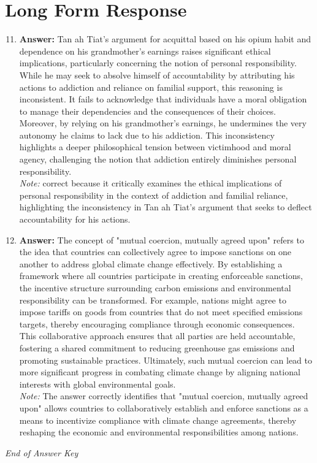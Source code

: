 \documentclass[12pt]{article}
\begin{document}
\section*{Long Form Response}
\begin{enumerate}[label=\arabic*.]
\setcounter{enumi}{10}
\item \textbf{Answer:} Tan ah Tiat's argument for acquittal based on his opium habit and dependence on his grandmother's earnings raises significant ethical implications, particularly concerning the notion of personal responsibility. While he may seek to absolve himself of accountability by attributing his actions to addiction and reliance on familial support, this reasoning is inconsistent. It fails to acknowledge that individuals have a moral obligation to manage their dependencies and the consequences of their choices. Moreover, by relying on his grandmother's earnings, he undermines the very autonomy he claims to lack due to his addiction. This inconsistency highlights a deeper philosophical tension between victimhood and moral agency, challenging the notion that addiction entirely diminishes personal responsibility.
\\ \textit{Note:} correct because it critically examines the ethical implications of personal responsibility in the context of addiction and familial reliance, highlighting the inconsistency in Tan ah Tiat's argument that seeks to deflect accountability for his actions.
\item \textbf{Answer:} The concept of "mutual coercion, mutually agreed upon" refers to the idea that countries can collectively agree to impose sanctions on one another to address global climate change effectively. By establishing a framework where all countries participate in creating enforceable sanctions, the incentive structure surrounding carbon emissions and environmental responsibility can be transformed. For example, nations might agree to impose tariffs on goods from countries that do not meet specified emissions targets, thereby encouraging compliance through economic consequences. This collaborative approach ensures that all parties are held accountable, fostering a shared commitment to reducing greenhouse gas emissions and promoting sustainable practices. Ultimately, such mutual coercion can lead to more significant progress in combating climate change by aligning national interests with global environmental goals.
\\ \textit{Note:} The answer correctly identifies that "mutual coercion, mutually agreed upon" allows countries to collaboratively establish and enforce sanctions as a means to incentivize compliance with climate change agreements, thereby reshaping the economic and environmental responsibilities among nations.
\end{enumerate}

\vfill
\noindent\textit{End of Answer Key}
\end{document}
